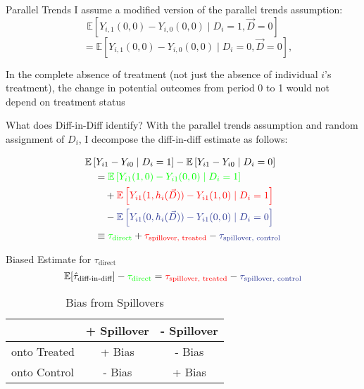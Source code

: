 \documentclass[aspectratio=43]{beamer}
\begin{document}
\begin{frame}{Parallel Trends}
    I assume a modified version of the parallel trends assumption: 
    \[
        \mathbb{E}\left[ Y_{i,1}(0, 0) - Y_{i,0}(0, 0) \mid D_i = 1, \vec{D} = 0 \right] 
    \] \[
        \quad =
        \mathbb{E}\left[ Y_{i,1}(0, 0) - Y_{i,0}(0, 0) \mid D_i = 0, \vec{D} = 0 \right],
    \]

    \vspace{5mm}
    In the complete absence of treatment (not just the absence of individual $i$'s treatment), the change in potential outcomes from period 0 to 1 would not depend on treatment status
    
\end{frame}

\begin{frame}{What does Diff-in-Diff identify?}
    With the parallel trends assumption and random assignment of $D_i$, I decompose the diff-in-diff estimate as follows: 
        
    \begin{align*}
        &\mathbb{E} \left[ Y_{i1} - Y_{i0} \mid D_i = 1 \right] - \mathbb{E} \left[ Y_{i1} - Y_{i0} \mid D_i = 0 \right] \\
        &\quad = 
        \textcolor{green}{\mathbb{E} \left[ Y_{i1}(1, 0) - Y_{i1}(0, 0) \mid D_i = 1 \right]} \\
        &\quad\quad + 
        \textcolor{red}{\mathbb{E} \left[ Y_{i1}(1, h_i(\vec{D})) - Y_{i1}(1, 0) \mid D_i = 1 \right]} \\ 
        &\quad\quad - 
        \textcolor{purple}{\mathbb{E} \left[ Y_{i1}(0, h_i(\vec{D})) - Y_{i1}(0, 0) \mid D_i = 0 \right]} \\
        &\quad \equiv \textcolor{green}{\tau_{\text{direct}}} + \textcolor{red}{\tau_{\text{spillover, treated}}} - \textcolor{purple}{\tau_{\text{spillover, control}}}
    \end{align*}

\end{frame}

\begin{frame}{Biased Estimate for $\tau_{\text{direct}}$}
    \[ 
        \mathbb{E}[\hat{\tau}_{\text{diff-in-diff}}] - \textcolor{green}{\tau_{\text{direct}}} = \textcolor{red}{\tau_{\text{spillover, treated}}} - \textcolor{purple}{\tau_{\text{spillover, control}}}    
    \]

    \begin{table}
        \caption{Bias from Spillovers}
        \begin{tabular}{|l|cc|}
            \hline
            & + Spillover & - Spillover \\ \hline
            onto Treated & + Bias & - Bias \\
            onto Control & - Bias & + Bias \\
            \hline
        \end{tabular}
    \end{table}
\end{frame}
\end{document}
